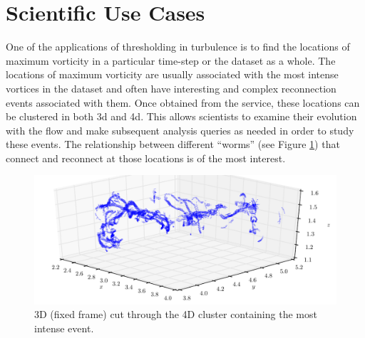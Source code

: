 \documentclass{sig-alternate}
\begin{document}
\section{Scientific Use Cases}\label{science_use_cases}

One of the applications of thresholding in turbulence is to find the locations of maximum vorticity in a particular time-step or the dataset as a whole.
The locations of maximum vorticity are usually associated with the most intense vortices in the dataset and often have interesting and complex
reconnection events associated with them. 
Once obtained from the service, these locations can be clustered in both 3d and 4d. This allows scientists to examine their evolution with the flow
and make subsequent analysis queries as needed in order to study these events. The relationship between different ``worms'' (see Figure \ref{fig:max_vort_cluster}) that connect and reconnect
at those locations is of the most interest.

\begin{figure}[t]
\centering
\includegraphics[width=7in]{Figures/most_intense_cluster_alt.pdf}
\caption{3D (fixed frame) cut through the 4D cluster containing the most intense event.}
\label{fig:max_vort_cluster}
\end{figure}
\end{document}
